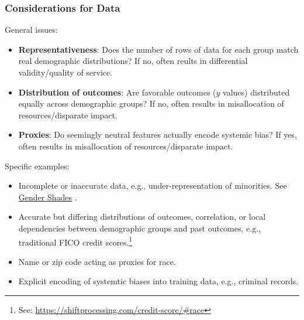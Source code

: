 \documentclass[11pt,aspectratio=169,hyperref={colorlinks}]{beamer}
\begin{document}
		\begin{frame}				
		
			\frametitle{Considerations for Data}

			\noindent \small General issues:\\
			\begin{itemize}\scriptsize
				\item\textbf{Representativeness}: Does the number of rows of data for each group match real demographic distributions? If no, often reults in differential validity/quality of service.
				\item \textbf{Distribution of outcomes}: Are favorable outcomes ($y$ values) distributed equally across demographic groups? If no, often results in misallocation of resources/disparate impact. 
				\item \textbf{Proxies}: Do seemingly neutral features actually encode systemic bias? If yes, often results in misallocation of resources/disparate impact.   			
			\end{itemize}
			
			\noindent \small Specific examples:\\
			\begin{itemize}\scriptsize
				\item Incomplete or inaccurate data, e.g., under-representation of minorities. See \href{http://gendershades.org/}{Gender Shades} \cite{gender_shades}.
				\item Accurate but differing distributions of outcomes, correlation, or local dependencies between demographic groups and past outcomes, e.g., traditional FICO credit scores.\footnote{\scriptsize{See: \url{https://shiftprocessing.com/credit-score/\#race}}}
				\item Name or zip code acting as proxies for race.
				\item Explicit encoding of systemtic biases into training data, e.g., criminal records.
			\end{itemize}

		\end{frame}
\end{document}
